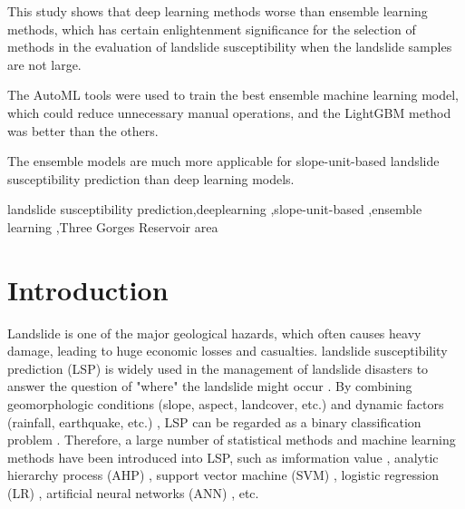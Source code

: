 \documentclass[a4paper,fleqn]{cas-sc}
\begin{document}
 
\begin{highlights}
\item This study shows that deep learning methods worse than ensemble learning methods, which has certain enlightenment significance for the selection of methods in the evaluation of landslide susceptibility when the landslide samples are not large.
\item The AutoML tools were used to train the best ensemble machine learning model, which could reduce unnecessary manual operations, and the LightGBM method was better than the others.
\item The ensemble models are much more applicable for slope-unit-based landslide susceptibility prediction than deep learning models.
\end{highlights}

\begin{keywords}
landslide susceptibility prediction\sep deeplearning \sep slope-unit-based \sep ensemble learning \sep Three Gorges Reservoir area
\end{keywords}

\maketitle 

\printcredits

\doublespacing


\section{Introduction}
Landslide is one of the major geological hazards, which often causes heavy damage, leading to huge economic losses and casualties. 
landslide susceptibility prediction (LSP) is widely used in the management of landslide disasters to answer the question of "where" the landslide might occur \citep{pourghasemi2018analysis}. 
By combining geomorphologic conditions (slope, aspect, landcover, etc.) and dynamic factors (rainfall, earthquake, etc.) , LSP can be regarded as a binary classification problem \citep{Song2018, Khan2021}. 
Therefore, a large number of statistical methods and machine learning methods have been introduced into LSP, such as imformation value \citep{chen2016comparison_LSM_INFORVALUE, Gao2006IV_Wanzhou}, analytic hierarchy process (AHP) \citep{Park2013Landslide_LSM_AHP, Kayastha2013Application_LSM_AHP, Pourghasemi2013Landslide_LSM_AHP, Yalcin2008Catena, Yoshimatsu2006}, support vector machine (SVM) \citep{Marjanovi2011Landslide_LSM_SVM}, logistic regression (LR) \citep{2017Chenp147160,Ayalew2005Geomorphology,Pourghasemi2013landslide_LR_AHP,Solaimani2013LSM_FR_LR,Tsangaratos2016Comparison_LR_Bayas,Ozdemir2013ALSM_FR_WE_LR,Wu2015LSM_LR_FR,Lee2007LSM_FR_LR_ANN,Das2010LSM_LR_RMC}, artificial neural networks (ANN) \citep{Sevgen2019S, Bui2016Landslides_SVM_ANN_LR}, etc. 
\end{document}
